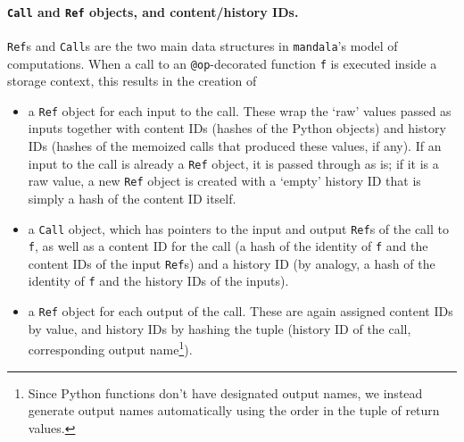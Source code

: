\documentclass{article} %
\begin{document}
\paragraph{\texttt{Call} and \texttt{Ref} objects, and content/history IDs.}
\texttt{Ref}s and \texttt{Call}s are the two main data structures in
\texttt{mandala}'s model of computations. When a call to an
\texttt{@op}-decorated function \texttt{f} is executed inside a storage context,
this results in the creation of 
\begin{itemize}
\item a \texttt{Ref} object for each input to the call. These wrap the `raw'
values passed as inputs together with content IDs (hashes of the Python objects)
and history IDs (hashes of the memoized calls that produced these values, if
any). If an input to the call is already a \texttt{Ref} object, it is passed
through as is; if it is a raw value, a new \texttt{Ref} object is created with a
`empty' history ID that is simply a hash of the content ID itself.
\item a \texttt{Call} object, which has pointers to the input and output
\texttt{Ref}s of the call to \texttt{f}, as well as a content ID for the call (a
hash of the identity of \texttt{f} and the content IDs of the input
\texttt{Ref}s) and a history ID (by analogy, a hash of the identity of
\texttt{f} and the history IDs of the inputs).
\item a \texttt{Ref} object for each output of the call. These are again
assigned content IDs by value, and history IDs by hashing the tuple (history ID
of the call, corresponding output name\footnote{Since Python functions don't
have designated output names, we instead generate output names automatically using the order in the tuple of return values.}).
\end{itemize}
\end{document}
